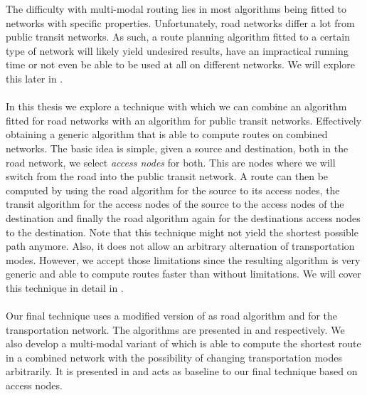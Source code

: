 	The difficulty with multi-modal routing lies in most algorithms being fitted to networks with specific properties.
	Unfortunately, road networks differ a lot from public transit networks. As such, a route planning algorithm
	fitted to a certain type of network will likely yield undesired results, have an impractical running time or not
	even be able to be used at all on different networks. We will explore this later in .\\\\
	In this thesis we explore a technique with which we can combine an algorithm fitted for road networks with an algorithm
	for public transit networks. Effectively obtaining a generic algorithm that is able to compute routes on combined networks.
	The basic idea is simple, given a source and destination, both in the road network, we select \textit{access nodes} for both.
	This are nodes where we will switch from the road into the public transit network. A route can then be computed by
	using the road algorithm for the source to its access nodes, the transit algorithm for the access nodes of the source
	to the access nodes of the destination and finally the road algorithm again for the destinations access nodes to
	the destination. Note that this technique might not yield the shortest possible path anymore. Also, it does not allow
	an arbitrary alternation of transportation modes. However, we accept those limitations since the resulting
	algorithm is very generic and able to compute routes faster than without limitations. We will cover this technique in detail
	in .\\\\
	Our final technique uses a modified version of \alt {} as road algorithm and \csa {} for the transportation network.
	The algorithms are presented in  and  respectively.
	We also develop a multi-modal variant of \dijkstra {} which is able to compute the shortest route in a combined
	network with the possibility of changing transportation modes arbitrarily. It is presented in 
	and acts as baseline to our final technique based on access nodes.
	
